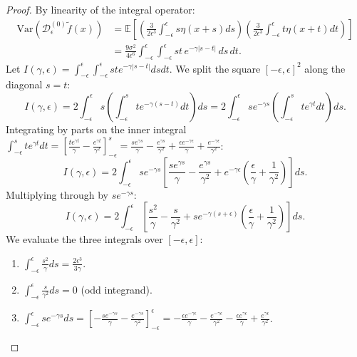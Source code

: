 \documentclass[11pt,a4paper]{article}
\theoremstyle{definition}
\begin{document}
\begin{proof}
By linearity of the integral operator:
\begin{align}
\text{Var}(\mathcal{D}_\epsilon^{(0)}\tilde{f}(x)) &= \mathbb{E}\left[ \left(\frac{3}{2\epsilon^3}\int_{-\epsilon}^\epsilon s \eta(x+s) ds\right) \left(\frac{3}{2\epsilon^3}\int_{-\epsilon}^\epsilon t \eta(x+t) dt\right) \right] \nonumber \\
&= \frac{9\sigma^2}{4\epsilon^6} \int_{-\epsilon}^\epsilon \int_{-\epsilon}^\epsilon st \, e^{-\gamma |s - t|} \, ds \, dt.
\end{align}
Let $I(\gamma, \epsilon) = \int_{-\epsilon}^\epsilon \int_{-\epsilon}^\epsilon st e^{-\gamma |s-t|} ds dt$. We split the square $[-\epsilon, \epsilon]^2$ along the diagonal $s = t$:
\begin{equation}
I(\gamma, \epsilon) = 2 \int_{-\epsilon}^\epsilon s \left( \int_{-\epsilon}^s t e^{-\gamma (s - t)} dt \right) ds = 2 \int_{-\epsilon}^\epsilon s e^{-\gamma s} \left( \int_{-\epsilon}^s t e^{\gamma t} dt \right) ds.
\end{equation}
Integrating by parts on the inner integral $\int_{-\epsilon}^s t e^{\gamma t} dt = \left[ \frac{t e^{\gamma t}}{\gamma} - \frac{e^{\gamma t}}{\gamma^2} \right]_{-\epsilon}^s = \frac{s e^{\gamma s}}{\gamma} - \frac{e^{\gamma s}}{\gamma^2} + \frac{\epsilon e^{-\gamma \epsilon}}{\gamma} + \frac{e^{-\gamma \epsilon}}{\gamma^2}$:
\begin{equation}
I(\gamma, \epsilon) = 2 \int_{-\epsilon}^\epsilon s e^{-\gamma s} \left[ \frac{s e^{\gamma s}}{\gamma} - \frac{e^{\gamma s}}{\gamma^2} + e^{-\gamma \epsilon} \left( \frac{\epsilon}{\gamma} + \frac{1}{\gamma^2} \right) \right] ds.
\end{equation}
Multiplying through by $s e^{-\gamma s}$:
\begin{equation}
I(\gamma, \epsilon) = 2 \int_{-\epsilon}^\epsilon \left[ \frac{s^2}{\gamma} - \frac{s}{\gamma^2} + s e^{-\gamma(s + \epsilon)} \left( \frac{\epsilon}{\gamma} + \frac{1}{\gamma^2} \right) \right] ds.
\end{equation}
We evaluate the three integrals over $[-\epsilon, \epsilon]$:
\begin{enumerate}
    \item $\int_{-\epsilon}^\epsilon \frac{s^2}{\gamma} ds = \frac{2\epsilon^3}{3\gamma}$.
    \item $\int_{-\epsilon}^\epsilon \frac{s}{\gamma^2} ds = 0$ (odd integrand).
    \item $\int_{-\epsilon}^\epsilon s e^{-\gamma s} ds = \left[ -\frac{s e^{-\gamma s}}{\gamma} - \frac{e^{-\gamma s}}{\gamma^2} \right]_{-\epsilon}^\epsilon = -\frac{\epsilon e^{-\gamma \epsilon}}{\gamma} - \frac{e^{-\gamma \epsilon}}{\gamma^2} - \frac{\epsilon e^{\gamma \epsilon}}{\gamma} + \frac{e^{\gamma \epsilon}}{\gamma^2}$.

\end{enumerate}
\end{proof}
\end{document}
